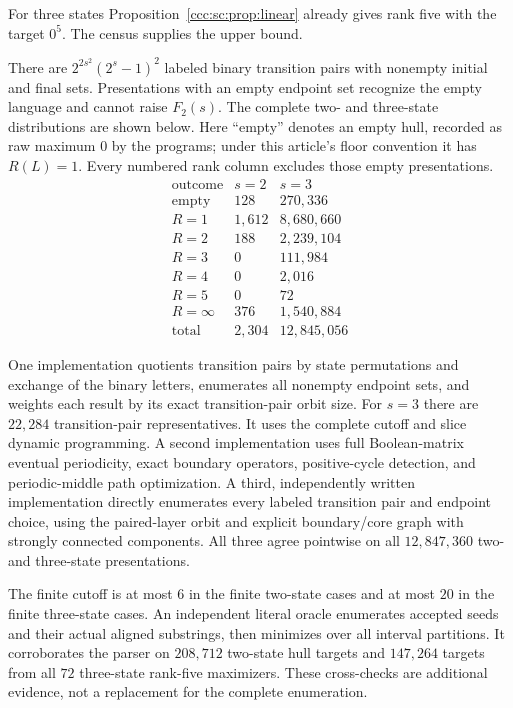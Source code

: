 \documentclass[11pt,letterpaper]{article}
\theoremstyle{definition}
\theoremstyle{remark}
\begin{document}
For three states Proposition~\ref{ccc:sc:prop:linear} already gives rank five with the target $0^5$. The census supplies the upper bound.

There are $2^{2s^2}(2^s-1)^2$ labeled binary transition pairs with nonempty initial and final sets. Presentations with an empty endpoint set recognize the empty language and cannot raise $F_2(s)$. The complete two- and three-state distributions are shown below. Here ``empty'' denotes an empty hull, recorded as raw maximum $0$ by the programs; under this article's floor convention it has $R(L)=1$. Every numbered rank column excludes those empty presentations.
\[
\begin{array}{c|r|r}
\text{outcome}&s=2&s=3\\\hline
\text{empty}&128&270{,}336\\
R=1&1{,}612&8{,}680{,}660\\
R=2&188&2{,}239{,}104\\
R=3&0&111{,}984\\
R=4&0&2{,}016\\
R=5&0&72\\
R=\infty&376&1{,}540{,}884\\\hline
\text{total}&2{,}304&12{,}845{,}056
\end{array}
\]

One implementation quotients transition pairs by state permutations and exchange of the binary letters, enumerates all nonempty endpoint sets, and weights each result by its exact transition-pair orbit size. For $s=3$ there are $22{,}284$ transition-pair representatives. It uses the complete cutoff and slice dynamic programming. A second implementation uses full Boolean-matrix eventual periodicity, exact boundary operators, positive-cycle detection, and periodic-middle path optimization. A third, independently written implementation directly enumerates every labeled transition pair and endpoint choice, using the paired-layer orbit and explicit boundary/core graph with strongly connected components. All three agree pointwise on all $12{,}847{,}360$ two- and three-state presentations.

The finite cutoff is at most $6$ in the finite two-state cases and at most $20$ in the finite three-state cases. An independent literal oracle enumerates accepted seeds and their actual aligned substrings, then minimizes over all interval partitions. It corroborates the parser on $208{,}712$ two-state hull targets and $147{,}264$ targets from all $72$ three-state rank-five maximizers. These cross-checks are additional evidence, not a replacement for the complete enumeration.
\end{document}
